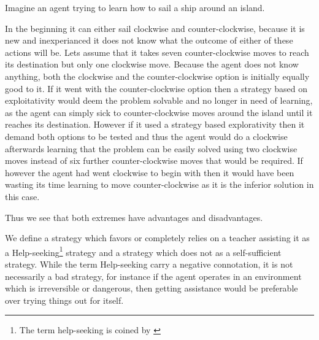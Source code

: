 \documentclass[../Master.tex]{subfiles}
\begin{document}
	\begin{example}
		Imagine an agent trying to learn how to sail a ship around an island.
		
		In the beginning it can either sail clockwise and counter-clockwise, because it is new and inexperianced it does not know what the outcome of either of these actions will be. 
		Lets assume that it takes seven counter-clockwise moves to reach its destination but only one clockwise move.
		Because the agent does not know anything, both the clockwise and the counter-clockwise option is initially equally good to it. If it went with the counter-clockwise option then a strategy based on exploitativity would deem the problem solvable and no longer in need of learning, as the agent can simply sick to counter-clockwise moves around the island until it reaches its destination. However if it used a strategy based explorativity then it demand both options to be tested and thus the agent would do a clockwise afterwards learning that the problem can be easily solved using two clockwise moves instead of six further counter-clockwise moves that would be required. If however the agent had went clockwise to begin with then it would have been wasting its time learning to move counter-clockwise as it is the inferior solution in this case.
		
		Thus we see that both extremes have advantages and disadvantages.
		
	\end{example}
	
	\begin{definition}
     We define a strategy which favors
    or completely relies on a teacher assisting it as a Help-seeking\footnote{The term help-seeking is coined by \cite{Gall1981224}} strategy
    and a strategy which does not as a self-sufficient strategy. While
    the term Help-seeking carry a negative connotation, it is not necessarily
    a bad strategy, for instance if the agent operates in an environment
    which is irreversible or dangerous, then getting assistance would
    be preferable over trying things out for itself. 

    \end{definition}
    
\end{document}
